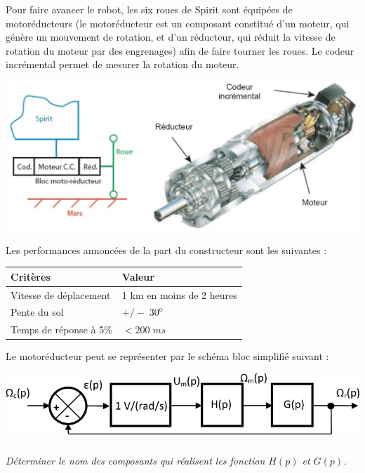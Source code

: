 \documentclass[10pt,fleqn]{article} %
\begin{document}
\begin{multicols}{2}
 
Pour faire avancer le robot, les six roues de Spirit sont équipées de motoréducteurs (le motoréducteur est un composant constitué d'un moteur, qui génère un mouvement de rotation, et d'un réducteur, qui réduit la vitesse de rotation du moteur par des engrenages) afin de faire tourner les roues. Le codeur incrémental permet de mesurer la rotation du moteur. 

\begin{center}
\includegraphics[width=\linewidth]{images/fig_02}
\end{center}


Les performances annoncées de la part du constructeur sont les suivantes : 
 
\begin{center}
\begin{tabular}{|p{.45\linewidth}|p{.45\linewidth}|}
\hline
Critères & Valeur \\
\hline
\hline
Vitesse de déplacement & 1 km en moins de 2 heures\\
\hline
Pente du sol & $+/- \;  30^{\text{o}}$ \\
\hline
Temps de réponse à 5\% & $<200\; ms$ \\
\hline
\end{tabular}
\end{center}

Le motoréducteur peut se représenter par le schéma bloc simplifié suivant : 

\begin{center}
\includegraphics[width=\linewidth]{images/fig_03}
\end{center}

\subparagraph{}
\textit{Déterminer le nom des composants qui réalisent les fonction $H(p)$ et $G(p)$.}


\end{multicols}
\end{document}
